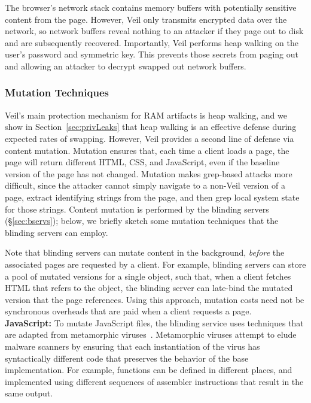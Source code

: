 The browser's network stack contains memory
buffers with potentially sensitive content
from the page. However, Veil only transmits
encrypted data over the network, so network
buffers reveal nothing to an attacker if
they page out to disk and are subsequently
recovered. Importantly, Veil performs
heap walking on the user's password and
symmetric key. This prevents those secrets
from paging out and allowing an attacker
to decrypt swapped out network buffers.

\subsubsection{Mutation Techniques}
\label{sec:mutation}
Veil's main protection mechanism for RAM
artifacts is heap walking, and we show in
Section~\ref{sec:privLeaks} that heap walking
is an effective defense during expected rates
of swapping. However, Veil provides a second
line of defense via content mutation. Mutation
ensures that, each time a client loads a page,
the page will return different HTML, CSS, and
JavaScript, even if the baseline version of the
page has not changed. Mutation makes grep-based
attacks more difficult, since the attacker
cannot simply navigate to a non-Veil version
of a page, extract identifying strings from the
page, and then grep local system state for those
strings. Content mutation is performed by the
blinding servers (\S\ref{sec:bservs}); below,
we briefly sketch some mutation techniques
that the blinding servers can employ.

Note that blinding servers can mutate content
in the background, \textit{before} the associated
pages are requested by a client. For example,
blinding servers can store a pool of mutated
versions for a single object, such that, when
a client fetches HTML that refers to the
object, the blinding server can late-bind
the mutated version that the page references.
Using this approach, mutation costs need not
be synchronous overheads that are paid when
a client requests a page.\\

\noindent
{\bf JavaScript:} To mutate JavaScript files, the
blinding service uses techniques that are adapted
from metamorphic viruses~\cite{hunting06}. Metamorphic
viruses attempt to elude malware scanners by
ensuring that each instantiation of the virus has
syntactically different code that preserves the
behavior of the base implementation. For example,
functions can be defined in different places, and
implemented using different sequences of assembler
instructions that result in the same output.

